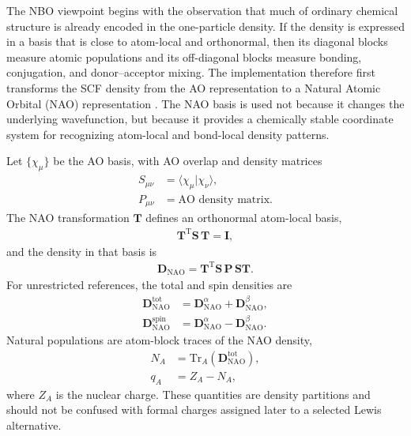 \documentclass[11pt]{article}
\newcommand{\nao}{\mathrm{NAO}}
\newcommand{\dens}{\mathbf{D}}
\begin{document}
The NBO viewpoint begins with the observation that much of ordinary chemical structure is already encoded in the one-particle density.  If the density is expressed in a basis that is close to atom-local and orthonormal, then its diagonal blocks measure atomic populations and its off-diagonal blocks measure bonding, conjugation, and donor--acceptor mixing.  The implementation therefore first transforms the SCF density from the AO representation to a Natural Atomic Orbital (NAO) representation \cite{ReedWeinholdNPA,NBOProgram}.  The NAO basis is used not because it changes the underlying wavefunction, but because it provides a chemically stable coordinate system for recognizing atom-local and bond-local density patterns.

Let $\{\chi_\mu\}$ be the AO basis, with AO overlap and density matrices
\begin{equation}
\begin{aligned}
	S_{\mu\nu} &= \langle \chi_\mu | \chi_\nu \rangle, \\
	P_{\mu\nu} &= \text{AO density matrix}.
\end{aligned}
\end{equation}
The NAO transformation $\mathbf{T}$ defines an orthonormal atom-local basis,
\begin{equation}
\begin{aligned}
	\mathbf{T}^{\mathrm{T}} \mathbf{S}\, \mathbf{T} = \mathbf{I},
\end{aligned}
\end{equation}
and the density in that basis is
\begin{align}
	\dens_{\nao}
	= \mathbf{T}^{\mathrm{T}} \mathbf{S}\, \mathbf{P}\, \mathbf{S}\mathbf{T}.
	\label{eq:nao-density-section2}
\end{align}
For unrestricted references, the total and spin densities are
\begin{equation}
\begin{aligned}
	\dens^{\mathrm{tot}}_{\nao}
	&= \dens^{\alpha}_{\nao}+\dens^{\beta}_{\nao}, \\
	\dens^{\mathrm{spin}}_{\nao}
	&= \dens^{\alpha}_{\nao}-\dens^{\beta}_{\nao}.
\end{aligned}
\end{equation}
Natural populations are atom-block traces of the NAO density,
\begin{equation}
\begin{aligned}
	N_A &= \mathrm{Tr}_A(\dens^{\mathrm{tot}}_{\nao}), \\
	q_A &= Z_A - N_A,
\end{aligned}
\end{equation}
where $Z_A$ is the nuclear charge.  These quantities are density partitions and should not be confused with formal charges assigned later to a selected Lewis alternative.
\end{document}
